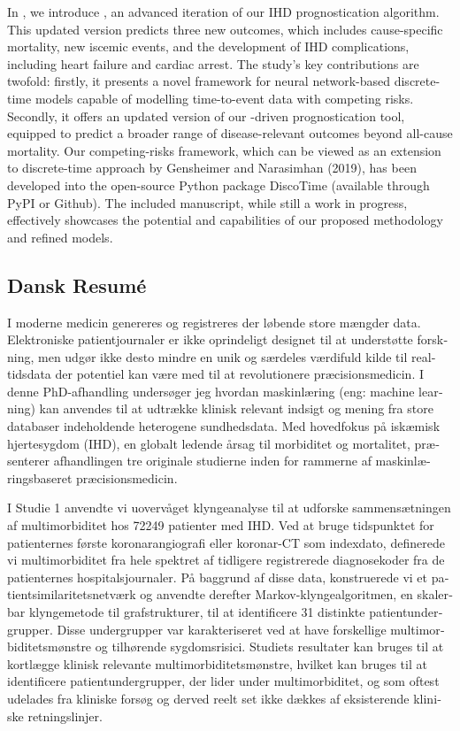 \begin{@empty}
In \studyiii{}, 
we introduce , an advanced iteration of our 
\ac{IHD} prognostication algorithm.
This updated version predicts three new outcomes,
which includes cause-specific mortality,
new iscemic events, and the development of 
\ac{IHD} complications, including heart failure and 
cardiac arrest.
The study's key contributions are twofold: 
firstly, it presents a novel framework for neural network-based discrete-time 
models capable of modelling time-to-event data with competing risks. 
Secondly, it offers an updated version
of our -driven prognostication tool, 
equipped to predict a broader range of disease-relevant outcomes 
beyond all-cause mortality. 
Our competing-risks framework,
which can be viewed as an extension to discrete-time approach by 
Gensheimer and Narasimhan (2019), 
has been developed into the open-source Python package \textsf{DiscoTime}
(available through PyPI or Github). 
The included manuscript, while still a work in progress, 
effectively showcases the potential and capabilities 
of our proposed methodology and refined models.

\begin{otherlanguage}{danish}
\chapter*{Dansk Resumé}

I moderne medicin genereres og registreres der løbende store mængder data.
Elektroniske patientjournaler 
er ikke oprindeligt designet til at understøtte forskning,
men udgør ikke desto mindre en unik og særdeles værdifuld kilde til
realtidsdata der potentiel kan være med til at revolutionere præcisionsmedicin.
I denne PhD-afhandling undersøger jeg hvordan maskinlæring 
(eng: machine learning) kan anvendes til at 
udtrække klinisk relevant indsigt og mening
fra store databaser indeholdende heterogene sundhedsdata. 
Med hovedfokus på iskæmisk hjertesygdom (IHD),
en globalt ledende årsag til morbiditet og mortalitet, 
præsenterer afhandlingen tre originale studierne
inden for rammerne af maskinlæringsbaseret præcisionsmedicin.

I Studie 1 anvendte vi uovervåget klyngeanalyse til at udforske 
sammensætningen af multimorbiditet hos \num{72249} patienter med IHD. 
Ved at bruge tidspunktet for patienternes første koronarangiografi eller 
koronar-CT som indexdato, 
definerede vi multimorbiditet fra hele spektret af tidligere 
registrerede diagnosekoder fra de patienternes hospitalsjournaler. 
På baggrund af disse data, konstruerede vi et patientsimilaritetsnetværk 
og anvendte derefter Markov-klyngealgoritmen, 
en skalerbar klyngemetode til grafstrukturer, 
til at identificere 31 distinkte patientundergrupper. 
Disse undergrupper var karakteriseret ved at have forskellige 
multimorbiditetsmønstre og tilhørende sygdomsrisici.
Studiets resultater kan bruges til at kortlægge klinisk relevante 
multimorbiditetsmønstre, hvilket kan bruges til at identificere 
patientundergrupper, der lider under multimorbiditet,
og som oftest udelades fra kliniske forsøg og derved reelt 
set ikke dækkes af eksisterende kliniske retningslinjer.



\end{otherlanguage}
\end{@empty}
